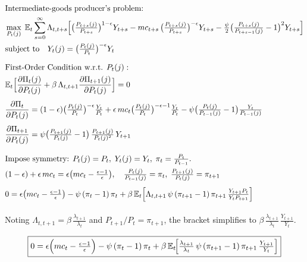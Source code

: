 \documentclass[11pt,preprint]{elsarticle}
\numberwithin{equation}{section}
\numberwithin{figure}{section}
\numberwithin{table}{section}
\begin{document}
\begin{align*}
& \text{Intermediate‐goods producer’s problem:} \\
& \max_{P_t(j)} \;\mathbb{E}_t \sum_{s=0}^{\infty} \Lambda_{t,t+s}
  \Bigl[
    \bigl(\tfrac{P_{t+s}(j)}{P_{t+s}}\bigr)^{1-\epsilon} Y_{t+s}
    - mc_{t+s}\,\bigl(\tfrac{P_{t+s}(j)}{P_{t+s}}\bigr)^{-\epsilon} Y_{t+s}
    - \tfrac{\psi}{2}\bigl(\tfrac{P_{t+s}(j)}{P_{t+s-1}(j)} - 1\bigr)^2 Y_{t+s}
  \Bigr] \\
& \text{subject to} \quad Y_t(j) = \bigl(\tfrac{P_t(j)}{P_t}\bigr)^{-\epsilon} Y_t
\\[1.5ex]
& \text{First‐Order Condition w.r.t. }P_t(j): \\
& \mathbb{E}_t\Bigl[
    \frac{\partial \Pi_t(j)}{\partial P_t(j)}
    + \beta\,\Lambda_{t,t+1}
      \frac{\partial \Pi_{t+1}(j)}{\partial P_t(j)}
  \Bigr] = 0
\\[1ex]
& \frac{\partial \Pi_t}{\partial P_t(j)}
  = (1-\epsilon)\bigl(\tfrac{P_t(j)}{P_t}\bigr)^{-\epsilon}\tfrac{Y_t}{P_t}
    + \epsilon\,mc_t\bigl(\tfrac{P_t(j)}{P_t}\bigr)^{-\epsilon-1}\tfrac{Y_t}{P_t}
    - \psi\bigl(\tfrac{P_t(j)}{P_{t-1}(j)}-1\bigr)\tfrac{Y_t}{P_{t-1}(j)}
\\[1ex]
& \frac{\partial \Pi_{t+1}}{\partial P_t(j)}
  = \psi\bigl(\tfrac{P_{t+1}(j)}{P_t(j)}-1\bigr)\,\tfrac{P_{t+1}(j)}{P_t(j)^2}\,Y_{t+1}
\\[2ex]
& \text{Impose symmetry: }P_t(j)=P_t,\;Y_t(j)=Y_t,\;\pi_t=\tfrac{P_t}{P_{t-1}}.\\
& (1-\epsilon)+\epsilon\,mc_t = \epsilon\bigl(mc_t-\tfrac{\epsilon-1}{\epsilon}\bigr),\quad
  \tfrac{P_t(j)}{P_{t-1}(j)}=\pi_t,\;\tfrac{P_{t+1}(j)}{P_t(j)}=\pi_{t+1}
\\[1ex]
& 0 = \epsilon\bigl(mc_t-\tfrac{\epsilon-1}{\epsilon}\bigr)
      - \psi\,(\pi_t-1)\,\pi_t
      + \beta\,\mathbb{E}_t\Bigl[
          \Lambda_{t,t+1}\,\psi\,(\pi_{t+1}-1)\,\pi_{t+1}
          \,\tfrac{Y_{t+1}P_t}{Y_tP_{t+1}}
        \Bigr]
\\[1ex]
\end{align*}

Noting \(\Lambda_{t,t+1}=\beta\,\tfrac{\lambda_{t+1}}{\lambda_t}\) and
\(P_{t+1}/P_t=\pi_{t+1}\), the bracket simplifies to
\(\beta\,\tfrac{\lambda_{t+1}}{\lambda_t}\,\tfrac{Y_{t+1}}{Y_t}\).

\begin{equation}\label{rotemberg_FOC}
\boxed{
  0 = \epsilon\Bigl(mc_t - \tfrac{\epsilon-1}{\epsilon}\Bigr)
      - \psi\,(\pi_t - 1)\,\pi_t
      + \beta\,\mathbb{E}_t\!
        \Bigl[
          \tfrac{\lambda_{t+1}}{\lambda_t}\,
          \psi\,(\pi_{t+1}-1)\,\pi_{t+1}\,
          \tfrac{Y_{t+1}}{Y_t}
        \Bigr]
}
\end{equation}
\end{document}

